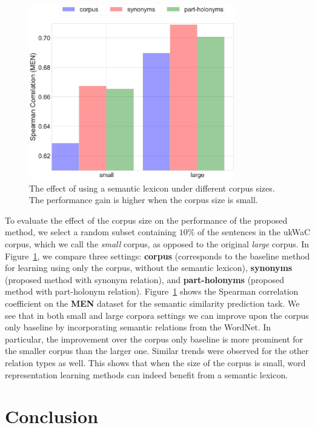 \documentclass[letterpaper]{article}
\begin{document}
\begin{figure}[t]
\centering
\includegraphics[width=90mm]{size.eps}
\caption{The effect of using a semantic lexicon under different corpus sizes. The performance gain is higher when the corpus size is small.}
\label{fig:size}
\end{figure}

To evaluate the effect of the corpus size on the performance of the proposed method, we select a random
subset containing $10\%$ of the sentences in the ukWaC corpus, which we call the \emph{small} corpus, as opposed to
the original \emph{large} corpus. In Figure~\ref{fig:size}, we compare three settings:
\textbf{corpus} (corresponds to the baseline method for learning using only the corpus, without the semantic lexicon),
\textbf{synonyms} (proposed method with synonym relation), and \textbf{part-holonyms} (proposed method with part-holonym
relation). Figure~\ref{fig:size} shows the Spearman correlation coefficient on the \textbf{MEN} dataset for the semantic similarity
prediction task. We see that in both small and large corpora settings we can improve upon the corpus only baseline
by incorporating semantic relations from the WordNet. In particular, the improvement over the corpus only baseline is
more prominent for the smaller corpus than the larger one. Similar trends were observed for the other relation types as well.
This shows that when the size of the corpus is small, word representation learning methods
can indeed benefit from a semantic lexicon.


\section{Conclusion}
\end{document}
